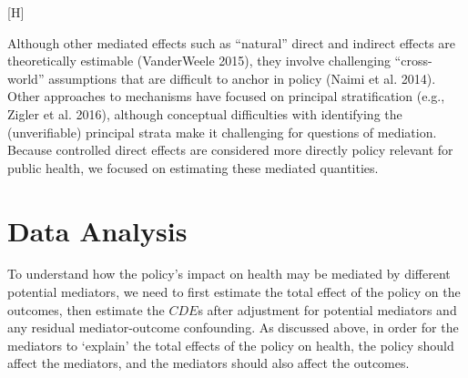 \documentclass[
  letterpaper,
  DIV=11,
  numbers=noendperiod]{scrartcl}
\makeatletter
\renewenvironment{figure}%
   {\renewcommand\familydefault\sfdefault
    \@float{figure}}
   {\end@float}
\makeatother
\begin{document}
\begin{figure}[H]


\caption{\label{fig-dag1}Hypothetical Directed Acyclic Graph showing
direct and indirect effects with outcome (\(Y\)), pre-treatment
covariates (\(X\)), policy (\(T\)), multiple mediators
(\(M_{1},M_{2}\)), as well as covariates for the mediators (\(W\)).}

\end{figure}%

Although other mediated effects such as ``natural'' direct and indirect
effects are theoretically estimable (VanderWeele 2015), they involve
challenging ``cross-world'' assumptions that are difficult to anchor in
policy (Naimi et al. 2014). Other approaches to mechanisms have focused
on principal stratification (e.g., Zigler et al. 2016), although
conceptual difficulties with identifying the (unverifiable) principal
strata make it challenging for questions of mediation. Because
controlled direct effects are considered more directly policy relevant
for public health, we focused on estimating these mediated quantities.

\section{Data Analysis}\label{data-analysis}

To understand how the policy's impact on health may be mediated by
different potential mediators, we need to first estimate the total
effect of the policy on the outcomes, then estimate the \(CDE\)s after
adjustment for potential mediators and any residual mediator-outcome
confounding. As discussed above, in order for the mediators to `explain'
the total effects of the policy on health, the policy should affect the
mediators, and the mediators should also affect the outcomes.
\end{document}
